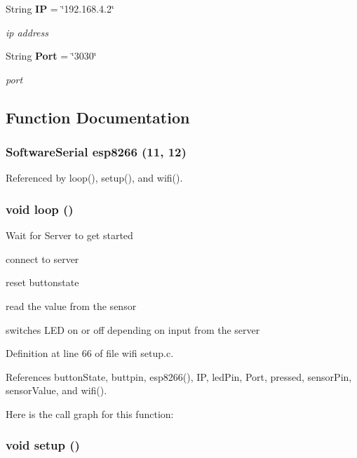 \begin{CompactItemize}
String {\bf IP} = \char`\"{}192.168.4.2\char`\"{}
\begin{CompactList}\small\item\em ip address \item\end{CompactList}\item 
String {\bf Port} = \char`\"{}3030\char`\"{}
\begin{CompactList}\small\item\em port \item\end{CompactList}\end{CompactItemize}


\subsection{Function Documentation}
\subsubsection{\setlength{\rightskip}{0pt plus 5cm}Software\-Serial esp8266 (11, 12)}\label{wifi_01setup_8c_84acb83d0d23cbcd7a6e88593eaabb9b}




Referenced by loop(), setup(), and wifi().
\subsubsection{\setlength{\rightskip}{0pt plus 5cm}void loop ()}\label{wifi_01setup_8c_64e0511a8547ef3fad470c7f04ab4b22}


Wait for Server to get started

connect to server

reset buttonstate

read the value from the sensor

switches LED on or off depending on input from the server 

Definition at line 66 of file wifi setup.c.

References button\-State, buttpin, esp8266(), IP, led\-Pin, Port, pressed, sensor\-Pin, sensor\-Value, and wifi().

Here is the call graph for this function:
\subsubsection{\setlength{\rightskip}{0pt plus 5cm}void setup ()}\label{wifi_01setup_8c_415266b005d267e801176f27c0434a50}


